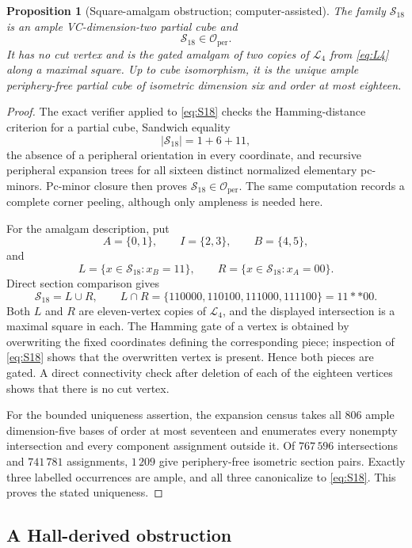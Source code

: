 \documentclass[11pt]{article}
\newtheorem{proposition}[theorem]{Proposition}
\theoremstyle{definition}
\theoremstyle{remark}
\newcommand{\Oper}{\mathcal O_{\mathrm{per}}}
\begin{document}
\begin{proposition}[Square-amalgam obstruction; computer-assisted]
\label{prop:square-amalgam-obstruction}
The family \(\mathcal S_{18}\) is an ample VC-dimension-two partial cube and
\[
 \mathcal S_{18}\in\Oper.
\]
It has no cut vertex and is the gated amalgam of two copies of
\(\mathcal L_4\) from \eqref{eq:L4} along a maximal square.  Up to cube
isomorphism, it is the unique ample periphery-free partial cube of isometric
dimension six and order at most eighteen.
\end{proposition}

\begin{proof}
The exact verifier applied to \eqref{eq:S18} checks the Hamming-distance
criterion for a partial cube, Sandwich equality
\[
 |\mathcal S_{18}|=1+6+11,
\]
the absence of a peripheral orientation in every coordinate, and recursive
peripheral expansion trees for all sixteen distinct normalized elementary
pc-minors.  Pc-minor closure then proves
\(\mathcal S_{18}\in\Oper\).  The same computation records a complete
corner peeling, although only ampleness is needed here.

For the amalgam description, put
\[
 A=\{0,1\},\qquad I=\{2,3\},\qquad B=\{4,5\},
\]
and
\[
 L=\{x\in\mathcal S_{18}:x_B=11\},\qquad
 R=\{x\in\mathcal S_{18}:x_A=00\}.
\]
Direct section comparison gives
\[
 \mathcal S_{18}=L\cup R,\qquad
 L\cap R=\{110000,110100,111000,111100\}=11{*}{*}00.
\]
Both \(L\) and \(R\) are eleven-vertex copies of \(\mathcal L_4\), and the
displayed intersection is a maximal square in each.  The Hamming gate of a
vertex is obtained by overwriting the fixed coordinates defining the
corresponding piece; inspection of \eqref{eq:S18} shows that the overwritten
vertex is present.  Hence both pieces are gated.  A direct connectivity check
after deletion of each of the eighteen vertices shows that there is no cut
vertex.

For the bounded uniqueness assertion, the expansion census takes all
\(806\) ample dimension-five bases of order at most seventeen and enumerates
every nonempty intersection and every component assignment outside it.  Of
\(767\,596\) intersections and \(741\,781\) assignments, \(1\,209\) give
periphery-free isometric section pairs.  Exactly three labelled occurrences
are ample, and all three canonicalize to \eqref{eq:S18}.  This proves the
stated uniqueness.
\end{proof}

\subsection{A Hall-derived obstruction}
\end{document}
